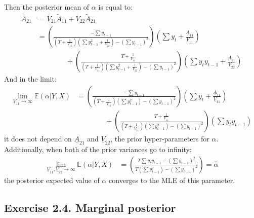 \documentclass[
  letterpaper,
  DIV=11,
  numbers=noendperiod]{scrreprt}
\begin{document}
Then the posterior mean of \(\alpha\) is equal to: \begin{align*}
\overline{A}_{21} &= \overline{V}_{21}\tilde{A}_{11} + \overline{V}_{22}\tilde{A}_{21}\\
&= \left( \frac{-\sum y_{t-1}}{ \left( T + \frac{1}{\underline{V}_{11}} \right)\left(\sum y_{t-1}^2 + \frac{1}{\underline{V}_{22}} \right) - \left( \sum y_{t-1}\right)^2 } \right)
\left( \sum y_t + \frac{\underline{A}_{11}}{\underline{V}_{11}} \right)\\
&\qquad\qquad+ \left( \frac{T + \frac{1}{\underline{V}_{11}}}{ \left( T + \frac{1}{\underline{V}_{11}} \right)\left(\sum y_{t-1}^2 + \frac{1}{\underline{V}_{22}} \right) - \left( \sum y_{t-1}\right)^2 } \right)\left( \sum y_t y_{t-1} + \frac{\underline{A}_{21}}{\underline{V}_{22}} \right)
\end{align*} And in the limit: \begin{align*}
\lim_{\underline{V}_{11}\rightarrow\infty}\mathbb{E}\left(\alpha|Y,X\right) 
&=  \left( \frac{-\sum y_{t-1}}{ \left( T + \frac{1}{\underline{V}_{11}} \right)\left(\sum y_{t-1}^2  \right) - \left( \sum y_{t-1}\right)^2 } \right)
\left( \sum y_t + \frac{\underline{A}_{11}}{\underline{V}_{11}} \right)\\
&\qquad\qquad+ \left( \frac{T + \frac{1}{\underline{V}_{11}}}{ \left( T + \frac{1}{\underline{V}_{11}} \right)\left(\sum y_{t-1}^2  \right) - \left( \sum y_{t-1}\right)^2 } \right)\left( \sum y_t y_{t-1}  \right)
\end{align*} it does not depend on \(\underline{A}_{21}\) and
\(\underline{V}_{22}\), the prior hyper-parameters for \(\alpha\).
Additionally, when both of the prior variances go to infinity:
\begin{align*}
\lim_{\underline{V}_{11},\underline{V}_{22}\rightarrow\infty}\mathbb{E}\left(\alpha|Y,X\right) 
&=  \left( \frac{T \sum y_t y_{t-1}-(\sum y_{t-1})^2}{ T \left(\sum y_{t-1}^2  \right) - \left( \sum y_{t-1}\right)^2 } \right) = \hat\alpha
\end{align*} the posterior expected value of \(\alpha\) converges to the
MLE of this parameter.

\hypertarget{exercise-2.4.-marginal-posterior}{%
\subsection*{Exercise 2.4. Marginal
posterior}\label{exercise-2.4.-marginal-posterior}}
\end{document}

